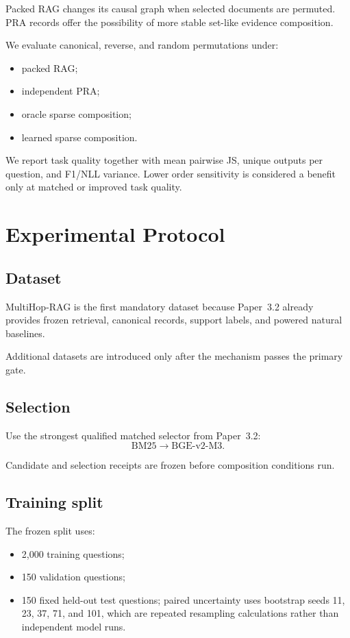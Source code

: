 \documentclass[11pt]{article}
\begin{document}
Packed RAG changes its causal graph when selected documents are permuted. PRA
records offer the possibility of more stable set-like evidence composition.

We evaluate canonical, reverse, and random permutations under:
\begin{itemize}[leftmargin=*]
    \item packed RAG;
    \item independent PRA;
    \item oracle sparse composition;
    \item learned sparse composition.
\end{itemize}

We report task quality together with mean pairwise JS, unique outputs per
question, and F1/NLL variance. Lower order sensitivity is considered a benefit
only at matched or improved task quality.

\section{Experimental Protocol}

\subsection{Dataset}

MultiHop-RAG is the first mandatory dataset because Paper~3.2 already provides
frozen retrieval, canonical records, support labels, and powered natural
baselines.

Additional datasets are introduced only after the mechanism passes the primary
gate.

\subsection{Selection}

Use the strongest qualified matched selector from Paper~3.2:
\[
\mathrm{BM25}\rightarrow\mathrm{BGE\mbox{-}v2\mbox{-}M3}.
\]

Candidate and selection receipts are frozen before composition conditions run.

\subsection{Training split}

The frozen split uses:
\begin{itemize}[leftmargin=*]
    \item 2,000 training questions;
    \item 150 validation questions;
    \item 150 fixed held-out test questions; paired uncertainty uses
    bootstrap seeds 11, 23, 37, 71, and 101, which are repeated resampling
    calculations rather than independent model runs.
\end{itemize}
\end{document}
